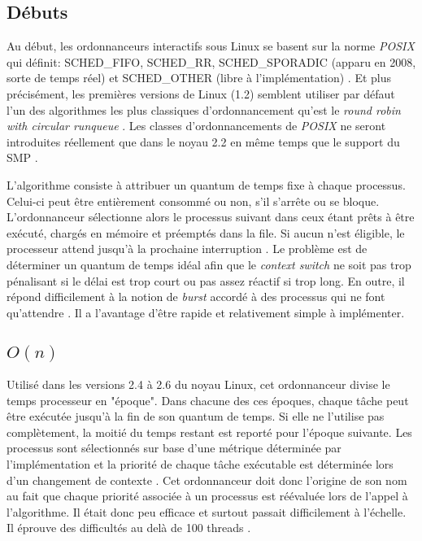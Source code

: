 \documentclass[letterpaper]{article}
\begin{document}
\subsection{Débuts}

Au début, les ordonnanceurs interactifs sous Linux se basent sur la norme \textit{POSIX} qui définit: SCHED\_FIFO, SCHED\_RR, SCHED\_SPORADIC (apparu en 2008, sorte de temps réel) et SCHED\_OTHER (libre à l'implémentation) \citep{6506091}. Et plus précisément, les premières versions de Linux (1.2) semblent utiliser par défaut l'un des algorithmes les plus classiques d'ordonnancement qu'est le \textit{round robin with circular runqueue} \citep{Maxwell:1999:LCK:519502, Beck:1996:LKI:547935}. Les classes d'ordonnancements de \textit{POSIX} ne seront introduites réellement que dans le noyau 2.2 en même temps que le support du SMP \citep{ScalableLinuxScheduling}.

L'algorithme consiste à attribuer un quantum de temps fixe à chaque processus. Celui-ci peut être entièrement consommé ou non, s'il s'arrête ou se bloque. L'ordonnanceur sélectionne alors le processus suivant dans ceux étant prêts à être exécuté, chargés en mémoire et préemptés dans la file. Si aucun n'est éligible, le processeur attend jusqu'à la prochaine interruption \citep{corbato1962experimental}. Le problème est de déterminer un quantum de temps idéal afin que le \textit{context switch} ne soit pas trop pénalisant si le délai est trop court ou pas assez réactif si trop long. En outre, il répond difficilement à la notion de \textit{burst} accordé à des processus qui ne font qu'attendre \citep{Bach:1986:DUO:8570}. Il a l'avantage d'être rapide et relativement simple à implémenter.

\subsection{$O(n)$}

Utilisé dans les versions 2.4 à 2.6 du noyau Linux, cet ordonnanceur divise le temps processeur en "époque". Dans chacune des ces époques, chaque tâche peut être exécutée jusqu'à la fin de son quantum de temps. Si elle ne l'utilise pas complètement, la moitié du temps restant est reporté pour l'époque suivante. Les processus sont sélectionnés sur base d'une métrique déterminée par l'implémentation et la priorité de chaque tâche exécutable est déterminée lors d'un changement de contexte \citep{Bovet:2005:ULK:1077084}.
Cet ordonnanceur doit donc l'origine de son nom au fait que chaque priorité associée à un processus est réévaluée lors de l'appel à l'algorithme. Il était donc peu efficace et surtout passait difficilement à l'échelle. Il éprouve des difficultés au delà de 100 threads \citep{Nieh:2001:VRO:647055.715911}.
\end{document}
